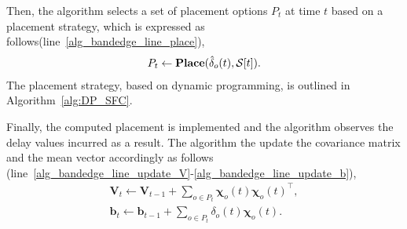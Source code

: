 Then, the algorithm selects a set of placement options $P_{t}$ at time $t$ based on a placement strategy, which is expressed as follows(line~\ref{alg_bandedge_line_place}),
\begin{gather}
	P_{t}\leftarrow \textbf{Place}(\hat{\delta}_{o}(t), \mathcal{S}[t]).
\end{gather}
The placement strategy, based on dynamic programming, is outlined in Algorithm~\ref{alg:DP_SFC}.

Finally, the computed placement is implemented and the algorithm observes the delay values
incurred as a result. The algorithm the update the covariance matrix
and the mean vector accordingly as follows (line~\ref{alg_bandedge_line_update_V}-\ref{alg_bandedge_line_update_b}),
\begin{gather}
	\pmb{V}_{t} \gets \pmb{V}_{t-1} + \sum_{{o}\in P_{t}} \pmb{\chi}_{o}(t)\pmb{\chi}_{o}(t)^{\intercal}, \label{eqn:v_update}\\
	\pmb{b}_{t} \gets \pmb{b}_{t-1} + \sum_{{o}\in P_{t}} \delta_{o}(t)\pmb{\chi}_{o}(t).\label{eqn:b_update}
\end{gather}


